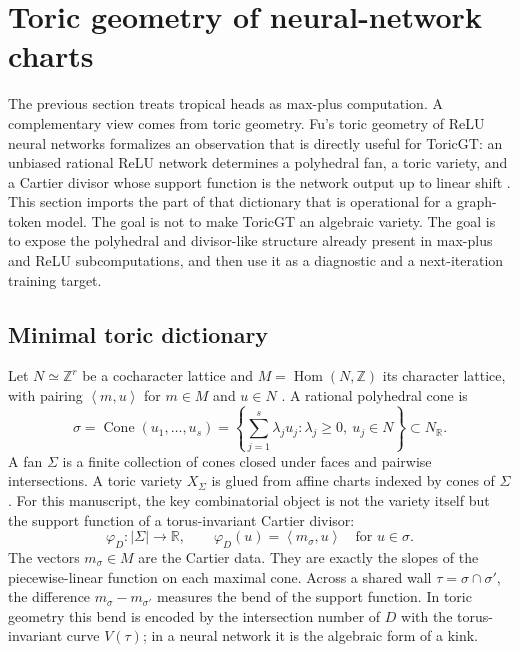 \documentclass[11pt]{article}
\theoremstyle{definition}
\theoremstyle{plain}
\theoremstyle{remark}
\numberwithin{equation}{section}
\newcommand{\R}{\mathbb{R}}
\newcommand{\Z}{\mathbb{Z}}
\newcommand{\ip}[2]{\left\langle #1,#2\right\rangle}
\begin{document}
\section{Toric geometry of neural-network charts}

The previous section treats tropical heads as max-plus computation.  A complementary view comes from toric geometry.  Fu's toric geometry of ReLU neural networks formalizes an observation that is directly useful for ToricGT: an unbiased rational ReLU network determines a polyhedral fan, a toric variety, and a Cartier divisor whose support function is the network output up to linear shift \cite{fu2025toricrelu}.  This section imports the part of that dictionary that is operational for a graph-token model.  The goal is not to make ToricGT an algebraic variety.  The goal is to expose the polyhedral and divisor-like structure already present in max-plus and ReLU subcomputations, and then use it as a diagnostic and a next-iteration training target.

\subsection{Minimal toric dictionary}

Let $N\simeq \Z^r$ be a cocharacter lattice and $M=\operatorname{Hom}(N,\Z)$ its character lattice, with pairing $\ip{m}{u}$ for $m\in M$ and $u\in N$ \cite{cox2011toric}.  A rational polyhedral cone is
\begin{equation}
  \sigma=\operatorname{Cone}(u_1,\ldots,u_s)
  =\left\{\sum_{j=1}^s\lambda_j u_j:\lambda_j\ge0,\ u_j\in N\right\}\subset N_\R.
\end{equation}
A fan $\Sigma$ is a finite collection of cones closed under faces and pairwise intersections.  A toric variety $X_\Sigma$ is glued from affine charts indexed by cones of $\Sigma$.  For this manuscript, the key combinatorial object is not the variety itself but the support function of a torus-invariant Cartier divisor:
\begin{equation}
  \varphi_D:|\Sigma|\to\R,\qquad
  \varphi_D(u)=\ip{m_\sigma}{u}\quad\text{for }u\in\sigma.
\end{equation}
The vectors $m_\sigma\in M$ are the Cartier data.  They are exactly the slopes of the piecewise-linear function on each maximal cone.  Across a shared wall $\tau=\sigma\cap\sigma'$, the difference $m_\sigma-m_{\sigma'}$ measures the bend of the support function.  In toric geometry this bend is encoded by the intersection number of $D$ with the torus-invariant curve $V(\tau)$; in a neural network it is the algebraic form of a kink.
\end{document}
